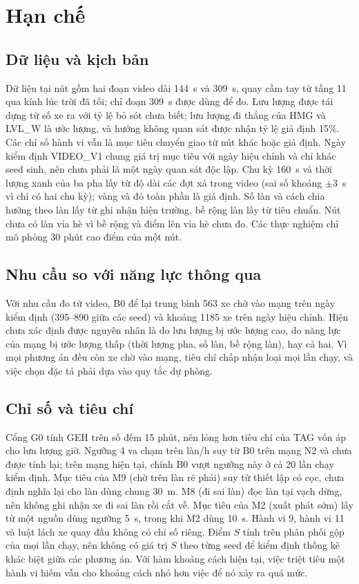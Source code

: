 \documentclass[../main.tex]{subfiles}
\begin{document}
\section{Hạn chế}
\label{section:limitations}

\subsection{Dữ liệu và kịch bản}

Dữ liệu tại nút gồm hai đoạn video dài 144~s và 309~s, quay cầm tay từ tầng 11 qua kính lúc trời đã tối; chỉ đoạn 309~s được dùng để đo. Lưu lượng được tái dựng từ số xe ra với tỷ lệ bỏ sót chưa biết; lưu lượng đi thẳng của HMG và LVL\_W là ước lượng, và hướng không quan sát được nhận tỷ lệ giả định 15\%. Các chỉ số hành vi vẫn là mục tiêu chuyển giao từ nút khác hoặc giả định. Ngày kiểm định VIDEO\_V1 chung giá trị mục tiêu với ngày hiệu chỉnh và chỉ khác seed sinh, nên chưa phải là một ngày quan sát độc lập. Chu kỳ 160~s và thời lượng xanh của ba pha lấy từ độ dài các đợt xả trong video (sai số khoảng $\pm 3$~s vì chỉ có hai chu kỳ); vàng và đỏ toàn phần là giả định. Số làn và cách chia hướng theo làn lấy từ ghi nhận hiện trường, bề rộng làn lấy từ tiêu chuẩn. Nút chưa có làn vỉa hè vì bề rộng và điểm lên vỉa hè chưa đo. Các thực nghiệm chỉ mô phỏng 30 phút cao điểm của một nút.

\subsection{Nhu cầu so với năng lực thông qua}

Với nhu cầu đo từ video, B0 để lại trung bình 563 xe chờ vào mạng trên ngày kiểm định (395--890 giữa các seed) và khoảng 1185 xe trên ngày hiệu chỉnh. Hiện chưa xác định được nguyên nhân là do lưu lượng bị ước lượng cao, do năng lực của mạng bị ước lượng thấp (thời lượng pha, số làn, bề rộng làn), hay cả hai. Vì mọi phương án đều còn xe chờ vào mạng, tiêu chí chấp nhận loại mọi lần chạy, và việc chọn đặc tả phải dựa vào quy tắc dự phòng.

\subsection{Chỉ số và tiêu chí}

Cổng G0 tính GEH trên số đếm 15 phút, nên lỏng hơn tiêu chí của TAG vốn áp cho lưu lượng giờ. Ngưỡng 4 va chạm trên làn/h suy từ B0 trên mạng N2 và chưa được tính lại; trên mạng hiện tại, chính B0 vượt ngưỡng này ở cả 20 lần chạy kiểm định. Mục tiêu của M9 (chờ trên làn rẽ phải) suy từ thiết lập có cọc, chưa định nghĩa lại cho làn dùng chung 30~m. M8 (đi sai làn) đọc làn tại vạch dừng, nên không ghi nhận xe đi sai làn rồi cắt về. Mục tiêu của M2 (xuất phát sớm) lấy từ một nguồn dùng ngưỡng 5~s, trong khi M2 dùng 10~s. Hành vi 9, hành vi 11 và luật lách xe quay đầu không có chỉ số riêng. Điểm $S$ tính trên phân phối gộp của mọi lần chạy, nên không có giá trị $S$ theo từng seed để kiểm định thống kê khác biệt giữa các phương án. Với hàm khoảng cách hiện tại, việc triệt tiêu một hành vi hiếm vẫn cho khoảng cách nhỏ hơn việc để nó xảy ra quá mức.
\end{document}
